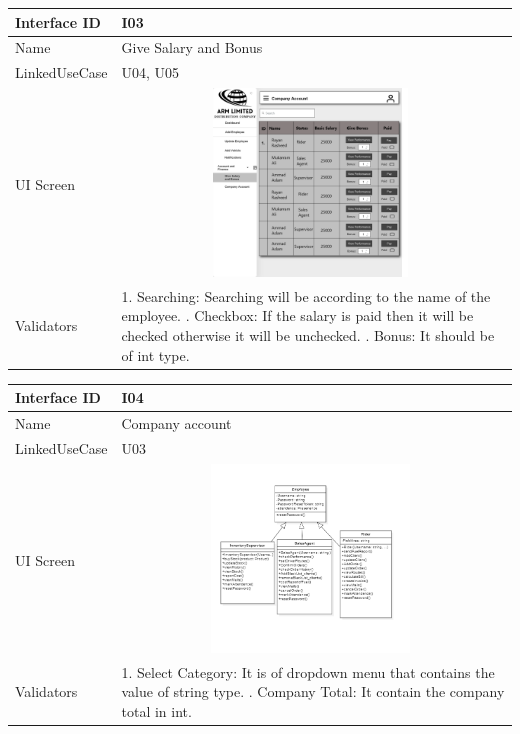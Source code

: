 \documentclass[12pt]{article}
\begin{document}
\begin{table}[H] 
\begin{tabular} {|m{6em}|m{12cm}|}
\hline
Interface ID & I03 \\ \hline
\newline
Name & Give Salary and Bonus\\ \hline
LinkedUseCase & U04, U05 \\ \hline
UI Screen &\newline \includegraphics [width=10cm, height=5cm] {r.png} \\ \hline
Validators &  1. Searching: Searching will be according to the name of the employee.
\newline
2. Checkbox: If the salary is paid then it will be checked otherwise it will be unchecked.
\newline
3. Bonus: It should be of int type.
\\ \hline
\end{tabular}
\end{table}
\begin{table}[H] 
\begin{tabular} {|m{6em}|m{12cm}|}
\hline
Interface ID & I04 \\ \hline
\newline
Name & Company account\\ \hline
LinkedUseCase & U03 \\ \hline
UI Screen &\newline \includegraphics [width=10cm, height=5cm] {4.png} \\ \hline
Validators &  1. Select Category: It is of dropdown menu that contains the value of string type.
\newline
2. Company Total: It contain the company total in int.
\\ \hline
\end{tabular}
\end{table}
\end{document}
